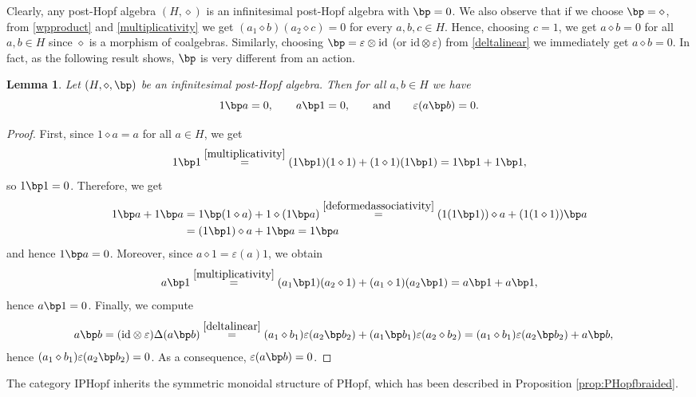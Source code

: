 \documentclass[10pt]{article}
\newtheorem {lemma} {Lemma}
\theoremstyle{definition}
\renewcommand{\wp}{\diamond}
\newcommand{\ot}{\otimes}
\begin{document}
Clearly, any post-Hopf algebra $(H,\wp)$ is an infinitesimal post-Hopf algebra with $\bp=0$. We also observe that if we choose $\bp=\wp$, from \eqref{wpproduct} and \eqref{multiplicativity} we get $(a_{1}\wp b)(a_{2}\wp c)=0$ for every $a,b,c\in H$. Hence, choosing $c=1$, we get $a\wp b=0$ for all $a,b\in H$ since $\wp$ is a morphism of coalgebras. Similarly, choosing $\bp=\varepsilon\ot\mathrm{id}$ (or $\mathrm{id}\ot\varepsilon$) from \eqref{deltalinear} we immediately get $a\wp b=0$. In fact, as the following result shows, $\bp$ is very different from an action.


\begin{lemma}\label{lem:propertiesinfpostHopf}
Let $(H,\wp,\bp)$ be an infinitesimal post-Hopf algebra. Then for all $a,b \in H$ we have
\[1\bp a=0, \qquad a\bp 1=0, \qquad \text{and} \qquad  \varepsilon(a\bp b)=0  .\]
\end{lemma}

\begin{proof}
First, since $1\wp a=a$ for all $a\in H$, we get
\[
1\bp1\overset{\eqref{multiplicativity}}{=}(1\bp 1)(1\wp1)+(1\wp1)(1\bp 1)=1\bp 1+1\bp 1,
\]
so $1\bp 1=0$. Therefore, we get
\[
\begin{split}
1\bp a+1\bp a&=1\bp(1\wp a)+1\wp(1\bp a)\overset{\eqref{deformedassociativity}}{=}(1(1\bp1))\wp a+(1(1\wp1))\bp a\\&=(1\bp1)\wp a+1\bp a=1\bp a
\end{split}
\]
and hence $1\bp a=0$. Moreover, since $a\wp1=\varepsilon(a)1$, we obtain
\[
a\bp 1\overset{\eqref{multiplicativity}}{=}(a_{1}\bp 1)(a_{2}\wp1)+(a_{1}\wp1)(a_{2}\bp1)=a\bp1+a\bp1,
\]
hence $a\bp1=0$. Finally, we compute
\[
\begin{split}
a\bp b&=(\mathrm{id}\ot\varepsilon)\Delta(a\bp b)\overset{\eqref{deltalinear}}{=}(a_{1}\wp b_{1})\varepsilon(a_{2}\bp b_{2})+(a_{1}\bp b_{1})\varepsilon(a_{2}\wp b_{2})=(a_{1}\wp b_{1})\varepsilon(a_{2}\bp b_{2})+a\bp b,
\end{split}
\]
hence $(a_{1}\wp b_{1})\varepsilon(a_{2}\bp b_{2})=0$. As a consequence, $\varepsilon(a\bp b)=0$. 
\end{proof}

The category $\mathrm{IPHopf}$ inherits the symmetric monoidal structure of $\mathrm{PHopf}$, which has been described in Proposition \ref{prop:PHopfbraided}.
\end{document}

